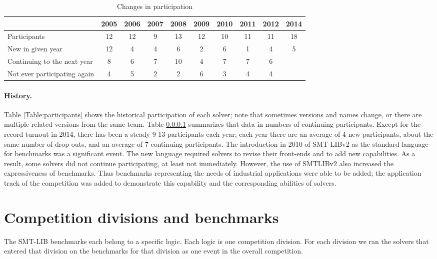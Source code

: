 \documentclass[twosize,11pt]{article}
\begin{document}
\begin{table}
\centering
\begin{tabular}{|l|c|c|c|c|c|c|c|c|c|}
\hline
 & 2005 & 2006 & 2007 & 2008 & 2009 & 2010 & 2011 & 2012 & 2014\\
\hline
Participants                 & 12 & 12 & 9 & 13 & 12 & 10 & 11 & 11 & 18 \\
New in given year            & 12 &  4 & 4 &  6 &  2 &  6 &  1 &  4 & 5 \\
Continuing to the next year  &  8 &  6 & 7 & 10 &  4 &  7 &  7 &  6 &  \\
Not ever participating again &  4 &  5 & 2 &  2 &  6 &  3 &  4 &  4 &  \\ 
\hline
\end{tabular}
\vspace{.2in}
\caption{Changes in participation}
\label{Table:changes}
\end{table}

\paragraph{History.} Table \ref{Table:participants} shows the
 historical participation of each solver; note that sometimes versions and names change, or there are multiple related versions from the same team. 
Table \ref{} summarizes that data in numbers of continuing participants. Except for the record turnout in
 2014, there has been a steady 9-13 participants each year; each year there are an average of 4 new
 participants, about the same number of drop-outs, and an average of 7 continuing participants. 
The introduction in 2010 of SMT-LIBv2 as the standard language for benchmarks was a significant event. The new language required solvers to revise their front-ends and to add new capabilities.
As a result, some solvers did not continue participating, at least not immediately. However, the use of SMTLIBv2 also increased the expressiveness of benchmarks. Thus benchmarks representing the needs of industrial applications were able to be added; 
the application track of the competition was added to demonstrate this capability and the corresponding abilities of solvers.

\section{Competition divisions and benchmarks}
\label{sec:benchmarks}

The SMT-LIB benchmarks each belong to a specific logic. Each logic is one competition division. For each division we ran the solvers that entered that division on the benchmarks for that division as one event in the overall competition.
\end{document}

